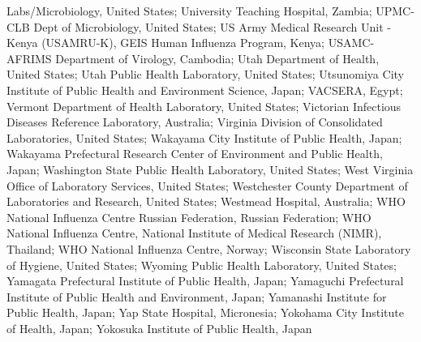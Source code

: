 Labs/Microbiology, United States; University Teaching Hospital, Zambia; UPMC-CLB Dept of Microbiology, United States; US Army Medical Research Unit - Kenya (USAMRU-K), GEIS Human Influenza Program, Kenya; USAMC-AFRIMS Department of Virology, Cambodia; Utah Department of Health, United States; Utah Public Health Laboratory, United States; Utsunomiya City Institute of Public Health and Environment Science, Japan; VACSERA, Egypt; Vermont Department of Health Laboratory, United States; Victorian Infectious Diseases Reference Laboratory, Australia; Virginia Division of Consolidated Laboratories, United States; Wakayama City Institute of Public Health, Japan; Wakayama Prefectural Research Center of Environment and Public Health, Japan; Washington State Public Health Laboratory, United States; West Virginia Office of Laboratory Services, United States; Westchester County Department of Laboratories and Research, United States; Westmead Hospital, Australia; WHO National Influenza Centre Russian Federation, Russian Federation; WHO National Influenza Centre, National Institute of Medical Research (NIMR), Thailand; WHO National Influenza Centre, Norway; Wisconsin State Laboratory of Hygiene, United States; Wyoming Public Health Laboratory, United States; Yamagata Prefectural Institute of Public Health, Japan; Yamaguchi Prefectural Institute of Public Health and Environment, Japan; Yamanashi Institute for Public Health, Japan; Yap State Hospital, Micronesia; Yokohama City Institute of Health, Japan; Yokosuka Institute of Public Health, Japan
